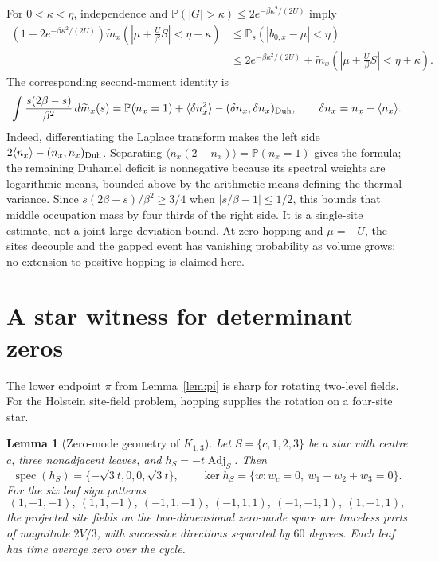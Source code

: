 \documentclass[11pt]{article}
\newtheorem{lemma}[theorem]{Lemma}
\theoremstyle{definition}
\theoremstyle{remark}
\DeclareMathOperator{\spec}{spec}
\newcommand{\Ad}{\operatorname{Adj}}
\begin{document}
For $0<\kappa<\eta$, independence and $\mathbb P(|G|>\kappa)\leq2e^{-\beta\kappa^2/(2U)}$ imply
\[
\begin{aligned}
\left(1-2e^{-\beta\kappa^2/(2U)}\right)\widetilde m_x\left(\left|\mu+\frac{U}{\beta}S\right|<\eta-\kappa\right)
&\leq \mathbb P_s(|b_{0,x}-\mu|<\eta)\\
&\leq2e^{-\beta\kappa^2/(2U)}+\widetilde m_x\left(\left|\mu+\frac{U}{\beta}S\right|<\eta+\kappa\right).
\end{aligned}
\]
The corresponding second-moment identity is
\[
 \int\frac{s(2\beta-s)}{\beta^2}\,d\widetilde m_x(s)
 =\mathbb P(n_x=1)+\langle\delta n_x^2\rangle-(\delta n_x,\delta n_x)_{\rm Duh},\qquad
 \delta n_x=n_x-\langle n_x\rangle.
\]
Indeed, differentiating the Laplace transform makes the left side $2\langle n_x\rangle-(n_x,n_x)_{\rm Duh}$. Separating $\langle n_x(2-n_x)\rangle=\mathbb P(n_x=1)$ gives the formula; the remaining Duhamel deficit is nonnegative because its spectral weights are logarithmic means, bounded above by the arithmetic means defining the thermal variance. Since $s(2\beta-s)/\beta^2\geq3/4$ when $|s/\beta-1|\leq1/2$, this bounds that middle occupation mass by four thirds of the right side. It is a single-site estimate, not a joint large-deviation bound. At zero hopping and $\mu=-U$, the sites decouple and the gapped event has vanishing probability as volume grows; no extension to positive hopping is claimed here.
\section{A star witness for determinant zeros}

The lower endpoint $\pi$ from Lemma~\ref{lem:pi} is sharp for rotating two-level fields. For the Holstein site-field problem, hopping supplies the rotation on a four-site star.

\begin{lemma}[Zero-mode geometry of $K_{1,3}$]\label{lem:star}
Let $S=\{c,1,2,3\}$ be a star with centre $c$, three nonadjacent leaves, and $h_S=-t\Ad_S$. Then
\[
 \spec(h_S)=\{-\sqrt3t,0,0,\sqrt3t\},\qquad
 \ker h_S=\{w:w_c=0,\ w_1+w_2+w_3=0\}.
\]
For the six leaf sign patterns
\[
 (1,-1,-1),\ (1,1,-1),\ (-1,1,-1),\ (-1,1,1),\ (-1,-1,1),\ (1,-1,1),
\]
the projected site fields on the two-dimensional zero-mode space are traceless parts of magnitude $2V/3$, with successive directions separated by $60$ degrees. Each leaf has time average zero over the cycle.
\end{lemma}
\end{document}
